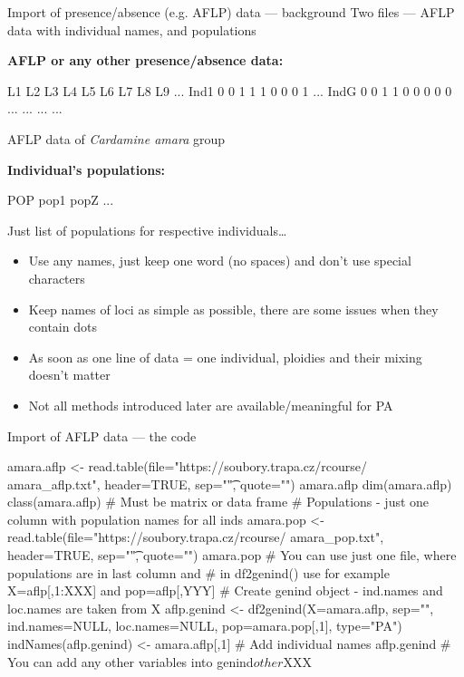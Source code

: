 \documentclass[compress, ucs, xelatex, 11pt, xcolor=svgnames, aspectratio=169,
	hyperref={
		bookmarks=true,
		unicode=true,
		colorlinks=true,
		pdftitle={Molecular data in R},
		plainpages=false,
		pdfauthor={Vojtech Zeisek},
		pdfsubject={Course about phylogeny and evolution in R},
		pdfcreator={XeLaTeX},
		pdfkeywords={R, evolution, phylogeny, molecular data},
		linkcolor=Crimson, %
		anchorcolor=Magenta, %
		citecolor=Magenta, %
		filecolor=Magenta, %
		menucolor=Magenta, %
		urlcolor=DodgerBlue, %
		pdftex},
	url={hyphens, lowtilde} %
	]{beamer}
\begin{document}
\begin{frame}[fragile]{Import of presence/absence (e.g. AFLP) data --- background}
	Two files --- AFLP data with individual names, and populations
	\vfill
	\begin{multicols}{2}
	\vfill
	\textbf{AFLP or any other presence/absence data:}
	\vfill
	\begin{spluscode}
        L1 L2 L3 L4 L5 L6 L7 L8 L9 ...
    Ind1 0  0  1  1  1  0  0  0  1 ...
    IndG 0  0  1  1  0  0  0  0  0 ...
     ...  ...                      ...
	\end{spluscode}
	\vfill
	\begin{footnotesize}
		AFLP data of \textit{Cardamine amara} group
	\end{footnotesize}
	\vfill
	\textbf{Individual's populations:}
	\vfill
	\begin{spluscode}
    POP
    pop1
    popZ
    ...
	\end{spluscode}
	\vfill
	\begin{footnotesize}
		Just list of populations for respective individuals\ldots
	\end{footnotesize}
	\columnbreak
	\begin{itemize}
		\item Use any names, just keep one word (no spaces) and don't use special characters
		\item Keep names of loci as simple as possible, there are some issues when they contain dots
		\item As soon as one line of data = one individual, ploidies and their mixing doesn't matter
		\item Not all methods introduced later are available/meaningful for PA
	\end{itemize}
	\end{multicols}
\end{frame}

\begin{frame}[fragile]{Import of AFLP data --- the code}
	\begin{spluscode}
    amara.aflp <- read.table(file="https://soubory.trapa.cz/rcourse/
      amara_aflp.txt", header=TRUE, sep="\t", quote="")
    amara.aflp
    dim(amara.aflp)
    class(amara.aflp) # Must be matrix or data frame
    # Populations - just one column with population names for all inds
    amara.pop <- read.table(file="https://soubory.trapa.cz/rcourse/
      amara_pop.txt", header=TRUE, sep="\t", quote="")
    amara.pop
    # You can use just one file, where populations are in last column and
    # in df2genind() use for example X=aflp[,1:XXX] and pop=aflp[,YYY]
    # Create genind object - ind.names and loc.names are taken from X
    aflp.genind <- df2genind(X=amara.aflp, sep="", ind.names=NULL,
      loc.names=NULL, pop=amara.pop[,1], type="PA")
    indNames(aflp.genind) <- amara.aflp[,1] # Add individual names
    aflp.genind
    # You can add any other variables into genind$other$XXX
	\end{spluscode}
\end{frame}
\end{document}
